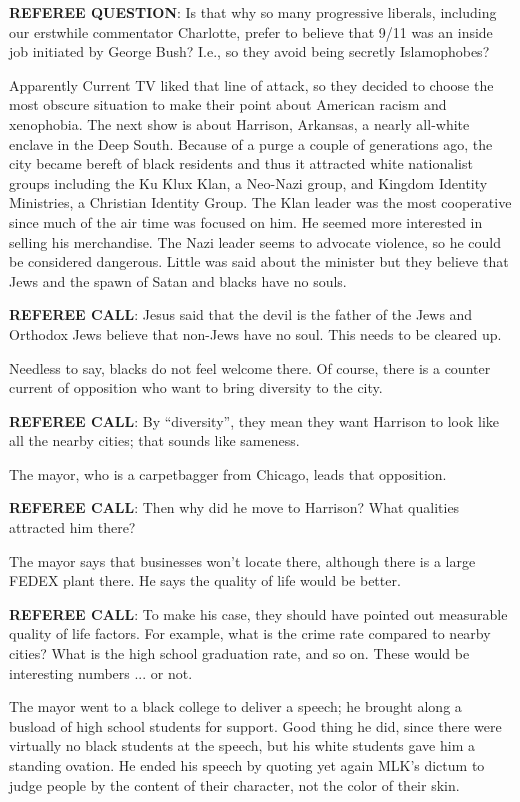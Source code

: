 \textbf{REFEREE QUESTION}: Is that why so many progressive liberals, including our erstwhile commentator Charlotte, prefer to believe that 9/11 was an inside job initiated by George Bush? I.e., so they avoid being secretly Islamophobes?

Apparently Current TV liked that line of attack, so they decided to choose the most obscure situation to make their point about American racism and xenophobia. The next show is about Harrison, Arkansas, a nearly all-white enclave in the Deep South. Because of a purge a couple of generations ago, the city became bereft of black residents and thus it attracted white nationalist groups including the Ku Klux Klan, a Neo-Nazi group, and Kingdom Identity Ministries, a Christian Identity Group. The Klan leader was the most cooperative since much of the air time was focused on him. He seemed more interested in selling his merchandise. The Nazi leader seems to advocate violence, so he could be considered dangerous. Little was said about the minister but they believe that Jews and the spawn of Satan and blacks have no souls.

\textbf{REFEREE CALL}: Jesus said that the devil is the father of the Jews and Orthodox Jews believe that non-Jews have no soul. This needs to be cleared up.

Needless to say, blacks do not feel welcome there. Of course, there is a counter current of opposition who want to bring diversity to the city.

\textbf{REFEREE CALL}: By ``diversity'', they mean they want Harrison to look like all the nearby cities; that sounds like sameness.

The mayor, who is a carpetbagger from Chicago, leads that opposition.

\textbf{REFEREE CALL}: Then why did he move to Harrison? What qualities attracted him there?

The mayor says that businesses won't locate there, although there is a large FEDEX plant there. He says the quality of life would be better.

\textbf{REFEREE CALL}: To make his case, they should have pointed out measurable quality of life factors. For example, what is the crime rate compared to nearby cities? What is the high school graduation rate, and so on. These would be interesting numbers ... or not.

The mayor went to a black college to deliver a speech; he brought along a busload of high school students for support. Good thing he did, since there were virtually no black students at the speech, but his white students gave him a standing ovation. He ended his speech by quoting yet again MLK's dictum to judge people by the content of their character, not the color of their skin.

